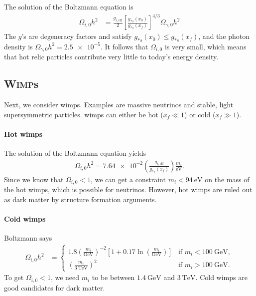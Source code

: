 The solution of the Boltzmann equation is
	\begin{align*}
		\Omega_{i,0} h^2
		&= \frac{ g_{i,\text{eff}} }{2}  \left[ \frac{g_{*s}(x_0)}{g_{*s}(x_f)} \right]^{4/3} \Omega_{\gamma, 0} h^2
	\end{align*}
The $g$'s are degeneracy factors and satisfy $g_{*s}(x_0) \leq g_{*s}(x_f)$, and the photon density is $\Omega_{\gamma,0} h^2 = \num{2.5e-5}$. It follows that $\Omega_{i,0}$ is very small, which means that hot relic particles contribute very little to today's energy density.

\subsection{\textsc{Wimp}s}


Next, we consider \acp{wimp}. Examples are massive neutrinos and stable, light supersymmetric particles. \Acp{wimp} can either be hot ($x_f \ll 1$) or cold ($x_f \gg 1$).

\paragraph*{Hot \acp{wimp}}
The solution of the Boltzmann equation yields
\begin{align*}
	\Omega_{i,0} h^2 = \num{7.64e-2} 
	\left( \frac{g_{i,\text{eff}}}{g_{*s}(x_f)} \right)
	\frac{m_i}{\si{\eV}}.
\end{align*}
Since we know that $\Omega_{i,0} < 1$, we can get a constraint $m_i < \SI{94}{\eV}$ on the mass of the hot \acp{wimp}, which is possible for neutrinos. However, hot \acp{wimp} are ruled out as dark matter by structure formation arguments.

\paragraph*{Cold \acp{wimp}}
Boltzmann says
\begin{align*}
	\Omega_{i,0} h^2
	&= \begin{cases}
	1.8 \left( \frac{m_i}{\si{\GeV}} \right)^{-2} 
	\left[ 1 + 0.17 \ln\left( \frac{m_i}{\si{\GeV}} \right) \right]
	& \text{if } m_i < \SI{100}{\GeV},\\
	\left( \frac{m_i}{\SI{3}{\TeV}} \right)^2
	& \text{if } m_i > \SI{100}{\GeV}.
	\end{cases}
\end{align*}
To get $\Omega_{i,0} < 1$, we need $m_i$ to be between $\SI{1.4}{\GeV}$ and $\SI{3}{\TeV}$. Cold \acp{wimp} are good candidates for dark matter.

